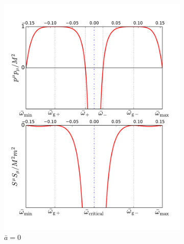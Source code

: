 \begin{figure}[!ht]
\centering
\begin{subfigure}{0.45\textwidth}
\includegraphics[width=\textwidth]{images/grafico-schwarzschild}
\caption{$\bar{a}=0$}
\label{fig:2}
\end{subfigure}
\begin{subfigure}{0.45\textwidth}

\end{subfigure}
\end{figure}

